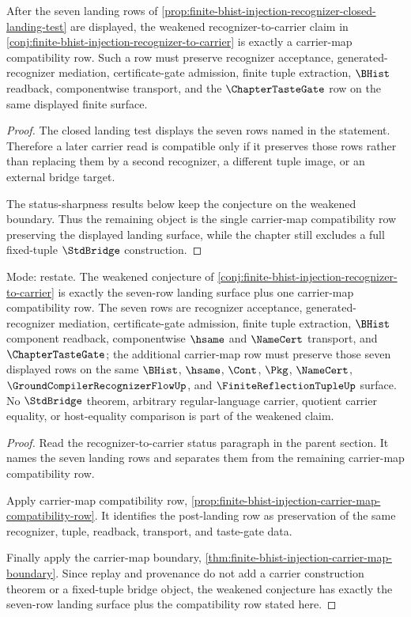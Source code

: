 \begin{proposition}
\label{prop:finite-bhist-injection-carrier-map-compatibility-row}
After the seven landing rows of \autoref{prop:finite-bhist-injection-recognizer-closed-landing-test} are displayed, the weakened recognizer-to-carrier claim in \autoref{conj:finite-bhist-injection-recognizer-to-carrier} is exactly a carrier-map compatibility row. Such a row must preserve recognizer acceptance, generated-recognizer mediation, certificate-gate admission, finite tuple extraction, $\BHist$ readback, componentwise transport, and the $\ChapterTasteGate$ row on the same displayed finite surface.
\end{proposition}
\begin{proof}
The closed landing test displays the seven rows named in the statement. Therefore a later carrier read is compatible only if it preserves those rows rather than replacing them by a second recognizer, a different tuple image, or an external bridge target.

The status-sharpness results below keep the conjecture on the weakened boundary. Thus the remaining object is the single carrier-map compatibility row preserving the displayed landing surface, while the chapter still excludes a full fixed-tuple $\StdBridge$ construction.
\end{proof}

\begin{theorem}
\label{thm:finite-bhist-injection-carrier-map-row-exactness}
Mode: restate. The weakened conjecture of \autoref{conj:finite-bhist-injection-recognizer-to-carrier} is exactly the seven-row landing surface plus one carrier-map compatibility row. The seven rows are recognizer acceptance, generated-recognizer mediation, certificate-gate admission, finite tuple extraction, $\BHist$ component readback, componentwise $\hsame$ and $\NameCert$ transport, and $\ChapterTasteGate$; the additional carrier-map row must preserve those seven displayed rows on the same $\BHist$, $\hsame$, $\Cont$, $\Pkg$, $\NameCert$, $\GroundCompilerRecognizerFlowUp$, and $\FiniteReflectionTupleUp$ surface. No $\StdBridge$ theorem, arbitrary regular-language carrier, quotient carrier equality, or host-equality comparison is part of the weakened claim.
\end{theorem}
\begin{proof}
Read the recognizer-to-carrier status paragraph in the parent section. It names the seven landing rows and separates them from the remaining carrier-map compatibility row.

Apply carrier-map compatibility row, \autoref{prop:finite-bhist-injection-carrier-map-compatibility-row}. It identifies the post-landing row as preservation of the same recognizer, tuple, readback, transport, and taste-gate data.

Finally apply the carrier-map boundary, \autoref{thm:finite-bhist-injection-carrier-map-boundary}. Since replay and provenance do not add a carrier construction theorem or a fixed-tuple bridge object, the weakened conjecture has exactly the seven-row landing surface plus the compatibility row stated here.
\end{proof}


